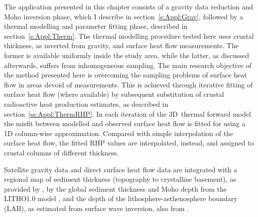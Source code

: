 The application presented in this chapter consists of a gravity data reduction and Moho inversion phase, which I describe in section~\ref{s:Appl:Grav}, followed by a thermal modelling and parameter fitting phase, described in section~\ref{s:Appl:Therm}.
The thermal modelling procedure tested here uses crustal thickness, as inverted from gravity, and surface heat flow measurements. The former is available uniformly inside the study area, while the latter, as discussed afterwards, suffers from inhomogeneous sampling.
The main research objective of the method presented here is overcoming the sampling problems of surface heat flow in areas devoid of measurements.
This is achieved through iterative fitting of surface heat flow (where available) by subsequent substitution of crustal radioactive heat production estimates, as described in section~\ref{ss:Appl:ThermRHP}.
In each iteration of the 3D~thermal forward model the misfit between modelled and observed surface heat flow is fitted for using a 1D column-wise approximation.
Compared with simple interpolation of the surface heat flow, the fitted RHP values are interpolated, instead, and assigned to crustal columns of different thickness.

Satellite gravity data and direct surface heat flow data are integrated with a regional map of sediment thickness (topography to crystalline basement), as provided by \textcite{Tesauro2008}, by the global sediment thickness and Moho depth from the {LITHO1.0} model \parencite{Pasyanos2014}, and the depth of the lithosphere-asthenosphere boundary (LAB), as estimated from surface wave inversion, also from \textcite{Pasyanos2014}.

